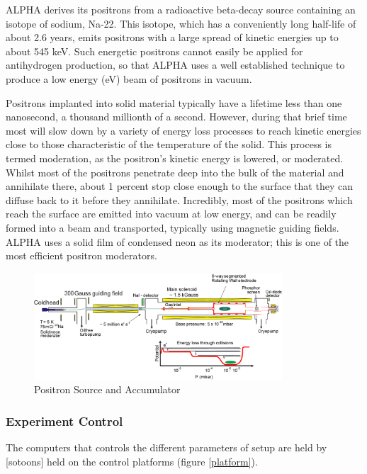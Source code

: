 \documentclass[12pt,a4paper]{article}
\begin{document}
ALPHA derives its positrons from a radioactive beta-decay source containing an isotope of sodium, Na-22. This isotope, which has a conveniently long half-life of about 2.6 years, emits positrons with a large spread of kinetic energies up to about 545 keV. Such energetic positrons cannot easily be applied for antihydrogen production, so that ALPHA uses a well established technique to produce a low energy (eV) beam of positrons in vacuum.

Positrons implanted into solid material typically have a lifetime less than one nanosecond, a thousand millionth of a second. However, during that brief time most will slow down by a variety of energy loss processes to reach kinetic energies close to those characteristic of the temperature of the solid. This process is termed moderation, as the positron’s kinetic energy is lowered, or moderated. Whilst most of the positrons penetrate deep into the bulk of the material and annihilate there, about 1 percent
 stop close enough to the surface that they can diffuse back to it before they annihilate. Incredibly, most of the positrons which reach the surface are emitted into vacuum at low energy, and can be readily formed into a beam and transported, typically using magnetic guiding fields. ALPHA uses a solid film of condensed neon as its moderator; this is one of the most efficient positron moderators.
 
 
\begin{figure}[h]
\centering
\includegraphics[width=110 mm, height=40mm]{fullsetup}
\caption{Positron Source and Accumulator}
\end{figure}

\subsubsection{Experiment Control}

The computers that controls the different parameters of setup are held by [sotoons] held on the control platforms (figure \ref{platform}). 
\end{document}
